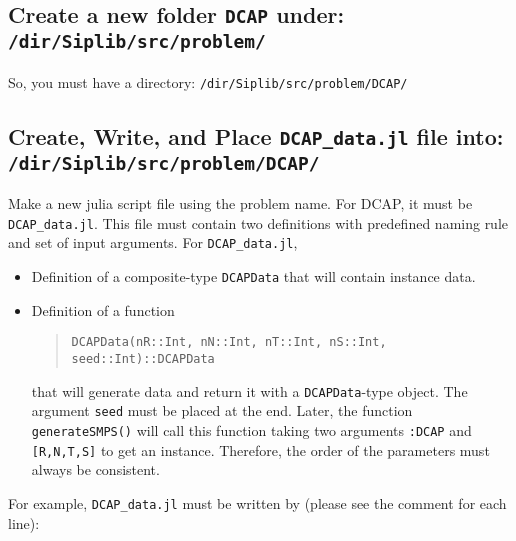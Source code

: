 \documentclass[11pt]{article}
\newcommand{\dcap}{\textsf{DCAP}}
\begin{document}
\subsection{Create a new folder \texttt{DCAP} under: \texttt{/dir/Siplib/src/problem/}}
So, you must have a directory: \texttt{/dir/Siplib/src/problem/DCAP/}
\subsection{Create, Write, and Place \texttt{DCAP\_data.jl} file into: \texttt{/dir/Siplib/src/problem/DCAP/}}
Make a new julia script file using the problem name. For \dcap, it must be \texttt{DCAP\_data.jl}. This file must contain two definitions with predefined naming rule and set of input arguments. For \texttt{DCAP\_data.jl},
\begin{itemize}
	\item Definition of a composite-type \texttt{DCAPData} that will contain instance data.
	\item Definition of a function
	\begin{quote}\centering\noindent\texttt{DCAPData(nR::Int, nN::Int, nT::Int, nS::Int, seed::Int)::DCAPData}\end{quote}
	that will generate data and return it with a \texttt{DCAPData}-type object. The argument \texttt{seed} must be placed at the end. Later, the function \texttt{generateSMPS()} will call this function taking two arguments \texttt{:DCAP} and \texttt{[R,N,T,S]} to get an instance. Therefore, the order of the parameters must always be consistent.
\end{itemize}
For example, \texttt{DCAP\_data.jl} must be written by (please see the comment for each line):
\end{document}
